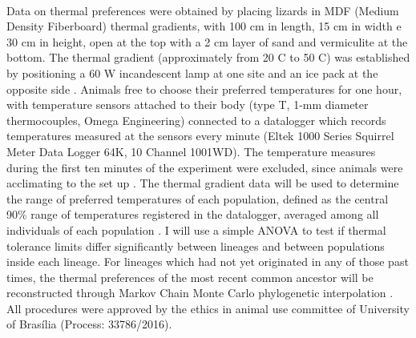 \documentclass{article}
\begin{document}
{%

\paragraph{} Data on thermal preferences were obtained by placing lizards in MDF (Medium Density Fiberboard) thermal gradients, with 100 cm in length, 15 cm in width e 30 cm in height, open at the top with a 2 cm layer of sand and vermiculite at the bottom. The thermal gradient (approximately from 20 \degree C to 50 \degree C) was established by positioning a 60 W incandescent lamp at one site and an ice pack at the opposite side \cite{paranjpe2013evidence}. Animals free to choose their preferred temperatures for one hour, with temperature sensors attached to their body (type T, 1-mm diameter thermocouples, Omega\textsuperscript{\textregistered} Engineering) connected to a datalogger which records temperatures measured at the sensors every minute (Eltek\textsuperscript{\textregistered} 1000 Series Squirrel Meter Data Logger 64K, 10 Channel 1001WD). The temperature measures during the first ten minutes of the experiment were excluded, since animals were acclimating to the set up \cite{paranjpe2013evidence}. The thermal gradient data will be used to determine the range of preferred temperatures of each population, defined as the central 90\% range of temperatures registered in the datalogger, averaged among all individuals of each population \cite{caetanotime}. I will use a simple ANOVA to test if thermal tolerance limits differ significantly between lineages and between populations inside each lineage. %
For lineages which had not yet originated in any of those past times, the thermal preferences of the most recent common ancestor will be reconstructed through Markov Chain Monte Carlo phylogenetic interpolation \cite{pagel2004bayesian}. All procedures were approved by the ethics in animal use committee of University of Brasília (Process: 33786/2016).

}
\end{document}
